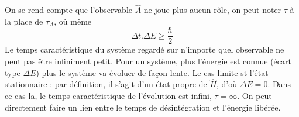 On se rend compte que l'observable $\hat A$ ne joue plus aucun rôle, on peut noter $\tau$ à 
la place de $\tau_A$, où même
\begin{equation}
\Delta t.\Delta E \geq\dfrac{\hbar}{2}
\end{equation}
Le temps caractéristique du système regardé sur n'importe quel observable ne peut pas être 
infiniment petit. Pour un système, plus l'énergie est connue (écart type $\Delta E$) plus le 
système va évoluer de façon lente. Le cas limite st l'état stationnaire : par définition, il 
s'agit d'un état propre de $\hat H$, d'où $\Delta E=0$. Dans ce cas la, le temps caractéristique 
de l'évolution est infini, $\tau=\infty$. On peut directement faire un lien entre le temps de 
désintégration et l'énergie libérée.
 
 
 
 
 
 
 
 
 
 
 
 
 
 
 